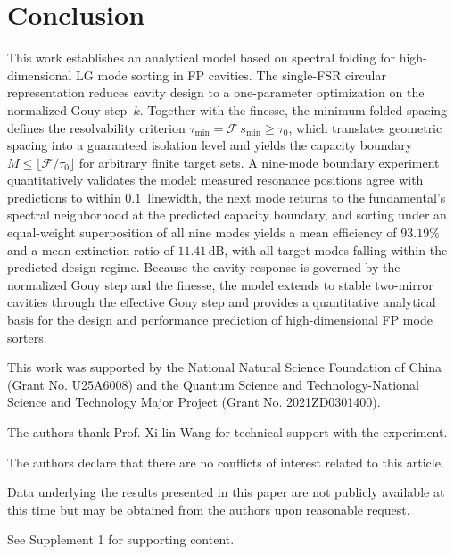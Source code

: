 \documentclass{optica-article}
\begin{document}
\section{Conclusion}

This work establishes an analytical model based on spectral folding for high-dimensional LG mode sorting in FP cavities. The single-FSR circular representation reduces cavity design to a one-parameter optimization on the normalized Gouy step~$k$. Together with the finesse, the minimum folded spacing defines the resolvability criterion $\tau_{\min}=\mathcal{F}\,s_{\min}\ge\tau_0$, which translates geometric spacing into a guaranteed isolation level and yields the capacity boundary $M\le\lfloor\mathcal{F}/\tau_0\rfloor$ for arbitrary finite target sets. A nine-mode boundary experiment quantitatively validates the model: measured resonance positions agree with predictions to within $0.1$~linewidth, the next mode returns to the fundamental's spectral neighborhood at the predicted capacity boundary, and sorting under an equal-weight superposition of all nine modes yields a mean efficiency of $93.19\%$ and a mean extinction ratio of $11.41\,\mathrm{dB}$, with all target modes falling within the predicted design regime. Because the cavity response is governed by the normalized Gouy step and the finesse, the model extends to stable two-mirror cavities through the effective Gouy step and provides a quantitative analytical basis for the design and performance prediction of high-dimensional FP mode sorters.

\begin{backmatter}
This work was supported by the National Natural Science Foundation of China (Grant No. U25A6008) and the Quantum Science and Technology-National Science and Technology Major Project (Grant No. 2021ZD0301400).

The authors thank Prof. Xi-lin Wang for technical support with the experiment.

The authors declare that there are no conflicts of interest related to this article.

Data underlying the results presented in this paper are not publicly available at this time but may be obtained from the authors upon reasonable request.

See Supplement 1 for supporting content.
\end{backmatter}


\end{document}
